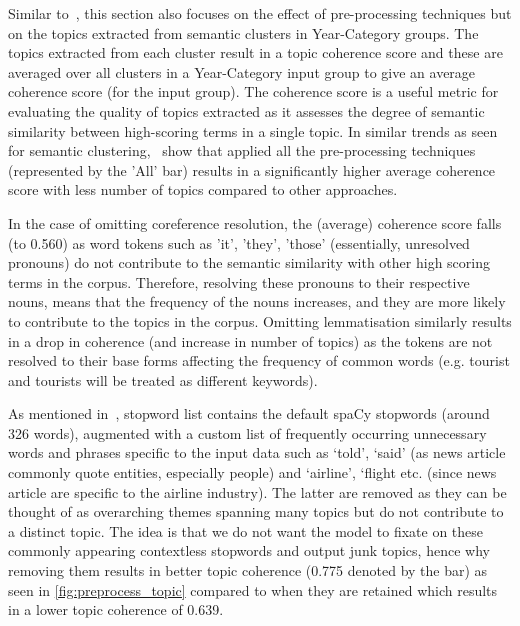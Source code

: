  Similar to~, this section also focuses on the effect of pre-processing techniques but on the topics extracted from semantic clusters in Year-Category groups. The topics extracted from each cluster result in a topic coherence score and these are averaged over all clusters in a Year-Category input group to give an average coherence score (for the input group). The coherence score is a useful metric for evaluating the quality of topics extracted as it assesses the degree of semantic similarity between high-scoring terms in a single topic. In similar trends as seen for semantic clustering,~ show that applied all the pre-processing techniques (represented by the 'All' bar) results in a significantly higher average coherence score with less number of topics compared to other approaches.  

In the case of omitting coreference resolution, the (average) coherence score falls (to 0.560) as word tokens such as 'it', 'they', 'those' (essentially, unresolved pronouns) do not contribute to the semantic similarity with other high scoring terms in the corpus. Therefore, resolving these pronouns to their respective nouns, means that the frequency of the nouns increases, and they are more likely to contribute to the topics in the corpus. Omitting lemmatisation similarly results in a drop in coherence (and increase in number of topics) as the tokens are not resolved to their base forms affecting the frequency of common words (e.g. tourist and tourists will be treated as different keywords).

As mentioned in~, stopword list contains the default spaCy stopwords (around 326 words), augmented with a custom list of frequently occurring unnecessary words and phrases specific to the input data such as `told', `said' (as news article commonly quote entities, especially people) and `airline', `flight etc. (since news article are specific to the airline industry). The latter are removed as they can be thought of as overarching themes spanning many topics but do not contribute to a distinct topic. The idea is that we do not want the model to fixate on these commonly appearing contextless stopwords and output junk topics, hence why removing them results in better topic coherence (0.775 denoted by the  bar) as seen in \ref{fig:preprocess_topic} compared to when they are retained which results in a lower topic coherence of 0.639.

